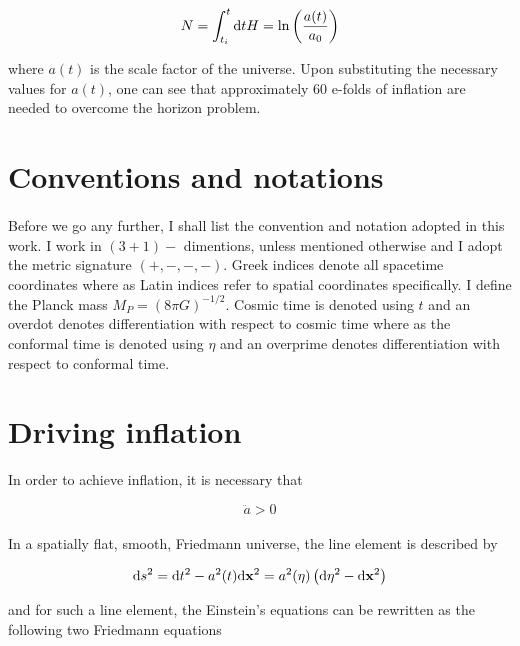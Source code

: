 \documentclass[12pt,a4paper,oneside]{book}
\begin{document}
\begin{equation}
N = \int^t_{t_i} {\rm d}t H = {\rm ln}\left(\frac{a(t)}{a_0}\right)
\end{equation}

\noindent where $a(t)$ is the scale factor of the universe. Upon substituting the necessary values for $a(t)$, one can see that approximately 60 e-folds of inflation are needed to 
overcome the horizon problem.

\section{Conventions and notations}

\paragraph*{} Before we go any further, I shall list the convention and notation adopted in this work. I work in $(3+1)-$ dimentions, unless 
mentioned otherwise and I adopt the metric signature $(+,-,-,-)$. Greek indices denote all spacetime coordinates where as Latin indices 
refer to spatial coordinates specifically. I define the Planck mass $M_P=\left(8\pi G\right)^{-1/2}$. Cosmic time is denoted using $t$ and 
an overdot denotes differentiation with respect to cosmic time where as the conformal time is denoted using $\eta$ and an overprime 
denotes differentiation with respect to conformal time.

\section{Driving inflation}

In order to achieve inflation, it is necessary that

\begin{equation}\label{eq:1}
\ddot{a} > 0
\end{equation}

\paragraph*{} In a spatially flat, smooth, Friedmann universe, the line element is described by

\begin{equation}
{\rm d}s^2 = {\rm d}t^2 - a^2(t){\rm d}{\bf x}^2 = a^2(\eta)\left({\rm d}\eta^2 - {\rm d}{\bf x}^2\right)
\end{equation}

\noindent and for such a line element, the Einstein's equations can be rewritten as the following two Friedmann equations
\end{document}

